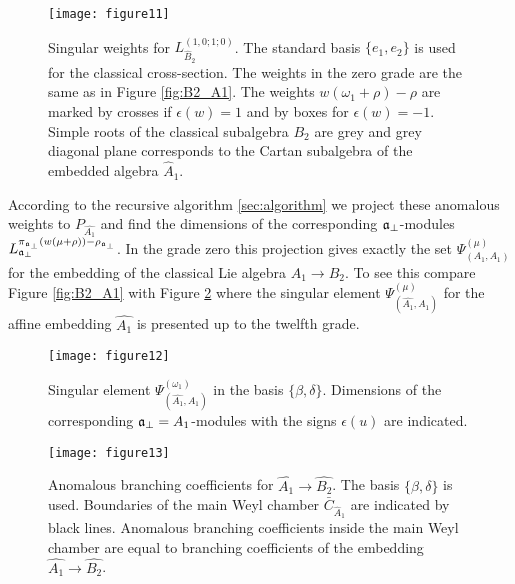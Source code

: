 \begin{figure}[h!tb]
  \texttt{[image: figure11]}
  \caption{Singular weights for $L^{(1,0;1;0)}_{\hat B_2 }$. The standard basis $\{e_1,e_2\}$ is used for the classical cross-section.
  The weights in the zero grade are the same as in Figure \ref{fig:B2_A1}.
  The weights $w (\omega_1+\rho)-\rho$ are marked by crosses if $\epsilon(w)=1$ and by boxes for $\epsilon(w)=-1$.
Simple roots of the classical subalgebra $B_2$ are grey and grey diagonal plane corresponds to the Cartan subalgebra
of the embedded algebra $\hat{A}_1$.}
  \label{fig:affine_B2_anom_point}
\end{figure}

According to the recursive algorithm \ref{sec:algorithm} we project these anomalous weights to
$P_{\hat{A_1}}$ and find the dimensions of the corresponding
$\mathfrak{a}_{\bot}$-modules $L^{\pi_{\mathfrak{a}_{\bot}}(w(\mu+\rho))-\rho_{\mathfrak{a}_{\bot}}}_{\mathfrak{a}_{\bot}}$.
In the grade zero this projection gives exactly the set
$\Psi ^{\left( \mu \right) }_{\left(  A_1, A_1 \right)}$ for the embedding of
the classical Lie algebra $A_1\rightarrow B_2$. To see this compare Figure \ref{fig:B2_A1}
with Figure \ref{fig:AffineB2_A1_anom_proj}
where the singular element $\Psi ^{\left( \mu \right) }_{\left(  \widehat{A_1}, A_1 \right)}$
for the affine embedding $\hat{A_1}$ is presented up to the twelfth grade.
\begin{figure}[h!tb]
  \centering
  \texttt{[image: figure12]}
  \caption{Singular element $\Psi ^{\left( \omega_1 \right) }_{\left(  \widehat{A_1}, A_1 \right)}$
  in the basis $\{\beta,\delta\}$. Dimensions of the corresponding $\mathfrak{a}_{\bot}=A_1$-modules
  with the signs $\epsilon(u)$ are indicated.}
  \label{fig:AffineB2_A1_anom_proj}
\end{figure}

\begin{figure}[h!bt]
  \centering
  \texttt{[image: figure13]}
  \caption{Anomalous branching coefficients for $\hat{A_1}\rightarrow \hat{B_2}$. The basis $\{\beta,\delta\}$ is used.
 Boundaries  of the main Weyl chamber $\bar{C}_{\hat{A}_1}$
 are indicated by black lines. Anomalous branching coefficients
 inside the main Weyl chamber are equal to branching coefficients of the embedding $\hat{A_1}\rightarrow \hat{B_2}$.}
  \label{fig:AffineB2_A1_branching}
\end{figure}

